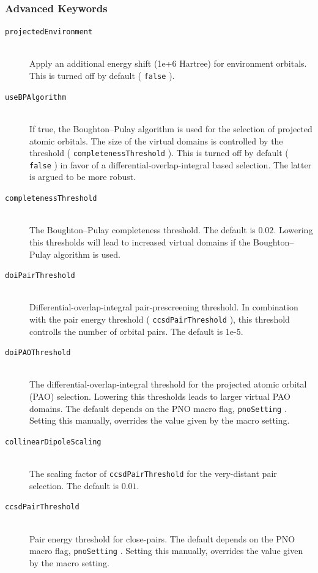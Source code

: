 \documentclass[bibliography=totocnumbered,a4paper,10pt,oneside]{scrbook}
\newcommand{\ttt}[1]{%
  \begingroup\setlength{\fboxsep}{1pt}%
  \colorbox{serenity-green!30}{\texttt{\hspace*{2pt}\vphantom{(g}#1\hspace*{2pt}}}%
  \endgroup
}
\begin{document}
\subsubsection{Advanced Keywords}
\begin{description}
    \item [\texttt{projectedEnvironment}]\hfill \\
    Apply an additional energy shift (1e+6 Hartree) for environment orbitals.
    This is turned off by default (\ttt{false}).
    \item [\texttt{useBPAlgorithm}]\hfill \\
    If true, the Boughton--Pulay algorithm is used for the selection of projected atomic orbitals. The size of the
    virtual domains is controlled by the threshold (\ttt{completenessThreshold}). This is turned off by default
    (\ttt{false}) in favor of a differential-overlap-integral based selection. The latter is argued to be more robust.
    \item [\texttt{completenessThreshold}]\hfill \\
    The Boughton--Pulay completeness threshold. The default is $0.02$. Lowering this thresholds will lead to
    increased virtual domains if the Boughton--Pulay algorithm is used.
    \item [\texttt{doiPairThreshold}]\hfill \\
    Differential-overlap-integral pair-prescreening threshold. In combination with the pair energy threshold
    (\ttt{ccsdPairThreshold}), this threshold controlls the number of orbital pairs.
    The default is 1e-5.
    \item [\texttt{doiPAOThreshold}]\hfill \\
    The differential-overlap-integral threshold for the projected atomic orbital (PAO) selection. Lowering this
    thresholds leads to larger virtual PAO domains. The default depends on the PNO macro flag,
    \ttt{pnoSetting}. Setting this manually, overrides the value given by the macro setting.
    \item [\texttt{collinearDipoleScaling}]\hfill \\
    The scaling factor of \ttt{ccsdPairThreshold} for the very-distant pair selection.
    The default is $0.01$.
    \item [\texttt{ccsdPairThreshold}]\hfill \\
    Pair energy threshold for close-pairs. The default depends on the PNO macro flag, \ttt{pnoSetting}.
    Setting this manually, overrides the value given by the macro setting.

\end{description}
\end{document}

